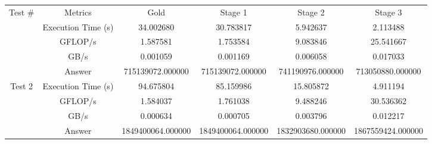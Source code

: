 \documentclass[10pt,a4paper]{article}
\begin{document}
\begin{adjustbox}{center}
\begin{tabular}{|c|c||c|c|c|c|}
\hline
Test \# & Metrics & Gold & Stage 1 & Stage 2 & Stage 3 \\ \hhline{|=|=||=|=|=|=|}
 
\multirow{4}{*}{Test 1} & \multicolumn{1}{c||}{Execution Time (s)} & \multicolumn{1}{c|}{34.002680} 
															       & \multicolumn{1}{c|}{30.783817} 
															       & \multicolumn{1}{c|}{5.942637}
															       & \multicolumn{1}{c|}{2.113488} \\\cline{2-6}
					    & \multicolumn{1}{c||}{GFLOP/s} & \multicolumn{1}{c|}{1.587581} 
					    								& \multicolumn{1}{c|}{1.753584}
					    								& \multicolumn{1}{c|}{9.083846} 
					    								& \multicolumn{1}{c|}{25.541667} \\\cline{2-6}
					    & \multicolumn{1}{c||}{GB/s} & \multicolumn{1}{c|}{0.001059} 
					    							 & \multicolumn{1}{c|}{0.001169} 
					    							 & \multicolumn{1}{c|}{0.006058}
					    							 & \multicolumn{1}{c|}{0.017033} \\\cline{2-6}
   					    & \multicolumn{1}{c||}{Answer} & \multicolumn{1}{c|}{715139072.000000} 
   					    							   & \multicolumn{1}{c|}{715139072.000000} 
   					    							   & \multicolumn{1}{c|}{741190976.000000} 
   					    							   & \multicolumn{1}{c|}{713050880.000000} \\\cline{2-6} \hline
   					    
\multirow{4}{*}{Test 2} & \multicolumn{1}{c||}{Execution Time (s)} & \multicolumn{1}{c|}{94.675804} 
															       & \multicolumn{1}{c|}{85.159986} 
															       & \multicolumn{1}{c|}{15.805872}
															       & \multicolumn{1}{c|}{4.911194} \\\cline{2-6}
					    & \multicolumn{1}{c||}{GFLOP/s} & \multicolumn{1}{c|}{1.584037} 
					    								& \multicolumn{1}{c|}{1.761038} 
					    								& \multicolumn{1}{c|}{9.488246}
					    								& \multicolumn{1}{c|}{30.536362} \\\cline{2-6}
					    & \multicolumn{1}{c||}{GB/s} & \multicolumn{1}{c|}{0.000634} 
					    							 & \multicolumn{1}{c|}{0.000705} 
					    							 & \multicolumn{1}{c|}{0.003796}
					    							 & \multicolumn{1}{c|}{0.012217} \\\cline{2-6}
   					    & \multicolumn{1}{c||}{Answer} & \multicolumn{1}{c|}{1849400064.000000} 
   					    							   & \multicolumn{1}{c|}{1849400064.000000}
   					    							   & \multicolumn{1}{c|}{1832903680.000000} 
   					    							   & \multicolumn{1}{c|}{1867559424.000000} \\\cline{2-6} \hline
   			

\end{tabular}
\end{adjustbox}
\end{document}
